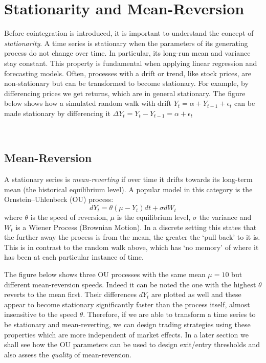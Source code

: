 \documentclass[11pt]{article}
\begin{document}
    
    \section{Stationarity and Mean-Reversion}\label{stationarity-and-mean-reversion}
    
    Before cointegration is introduced, it is important to understand the
concept of {\em stationarity}. A time series is stationary when the parameters
of its generating process do not change over time. In particular, its
long-run mean and variance stay constant. This property is fundamental
when applying linear regression and forecasting models.
Often, processes with a drift or trend, like stock prices, are
non-stationary but can be transformed to become stationary. For example,
by differencing prices we get returns, which are in general stationary.
The figure below shows how a simulated random walk with drift
\(Y_t = \alpha + Y_{t-1} + \epsilon_t\) can be made stationary by
differencing it \( \Delta Y_t = Y_t - Y_{t-1} = \alpha + \epsilon_t\)
    \begin{center}
    \end{center}
    { \hspace*{\fill} \\}
    
    
    \subsection{Mean-Reversion}\label{mean-reversion}
    
    
A stationary series is {\em mean-reverting} if over time it drifts towards its
long-term mean (the historical equilibrium level). A popular model in
this category is the Ornstein--Uhlenbeck (OU) process:
\begin{equation}
dY_t = \theta(\mu - Y_t)dt + \sigma dW_t
\end{equation}
where \(\theta\) is the speed of reversion, \(\mu\) is the equilibrium
level, \(\sigma\) the variance and \(W_t\) is a Wiener Process (Brownian
Motion). In a discrete setting this states that the further away the
process is from the mean, the greater the `pull back' to it is. This is
in contrast to the random walk above, which has `no memory' of where
it has been at each particular instance of time.


The figure below shows three OU processes with the same mean \(\mu=10\)
but different mean-reversion speeds. Indeed it can be noted the one with the highest
$\theta$ reverts to the mean first. Their differences \(dY_t\) are plotted
as well  and these appear to become stationary significantly faster than
the process itself, almost insensitive to the speed \(\theta\).
Therefore, if we are able to transform a time series to be stationary
and mean-reverting, we can design trading strategies using these
properties which are more independent of market effects. In a later
section we shall see how the OU parameters can be used to design
exit/entry thresholds and also assess the {\em quality} of mean-reversion.
\end{document}

